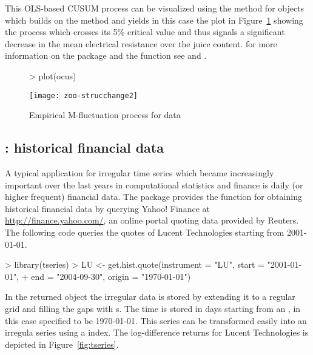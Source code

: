 \documentclass{Z}
\begin{document}
This OLS-based CUSUM process can be visualized using the  method
for  objects which builds on the  method and yields in
this case the plot in Figure~\ref{fig:strucchange} showing the process which
crosses its 5\% critical value and 
thus signals a significant decrease in the mean electrical resistance over the
juice content. for more information on the package  and the 
function  see \cite{zoo:Zeileis+Leisch+Hornik:2002} and 
\cite{zoo:Zeileis:2004}.

\begin{figure}
\begin{center}
\begin{Schunk}
\begin{Sinput}
> plot(ocus)
\end{Sinput}
\end{Schunk}
\texttt{[image: zoo-strucchange2]}
\caption{\label{fig:strucchange} Empirical M-fluctuation process for  data}
\end{center}
\end{figure}


\subsection[tseries: historical financial data]{: historical financial data}

A typical application for irregular time series which became increasingly
important over the last years in computational statistics and finance is
daily (or higher frequent) financial data. The package  provides
the function  for obtaining historical financial data
by querying Yahoo! Finance at \url{http://finance.yahoo.com/},
an online portal quoting data provided by Reuters. The following code
queries the quotes of Lucent Technologies starting from 2001-01-01.

\begin{Schunk}
\begin{Sinput}
> library(tseries)
> LU <- get.hist.quote(instrument = "LU", start = "2001-01-01", 
+     end = "2004-09-30", origin = "1970-01-01")
\end{Sinput}
\end{Schunk}


In the returned  object the irregular data is stored by extending
it to a regular grid and filling the gaps with s. The time is stored
in days starting from an , in this case specified to be 1970-01-01.
This series can be transformed easily into an irregula  series 
using a  index. The log-difference returns for Lucent 
Technologies is depicted in Figure~\ref{fig:tseries}.
\end{document}
